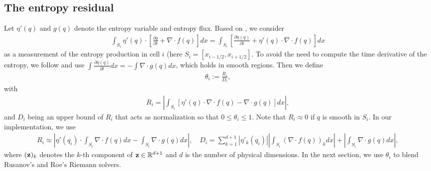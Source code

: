 \documentclass[preprint, 11pt]{article}
\newcommand{\imh}{{i-1/2}}
\newcommand{\iph}{{i+1/2}}
\newcommand{\bff}{{f}}
\newcommand{\entvar}{\eta'}
\newcommand{\bfq}{{q}}
\newcommand{\bfx}{{x}}
\newcommand{\entflux}{g}
\begin{document}
\subsection{The entropy residual}
Let $\entvar(\bfq)$ and $\entflux(\bfq)$ denote the entropy variable and entropy flux.
Based on \cite{guermond2011entropy}, we consider
\begin{align}\label{ent_residual}
  \int_{S_i} \entvar(\bfq) \cdot \left[ \frac{\partial \bfq}{\partial t} + \nabla\cdot \bff(\bfq)\right]d\bfx
  =\int_{S_i} \left[\frac{\partial \eta(\bfq)}{\partial t} + \entvar(\bfq) \cdot \nabla\cdot \bff(\bfq)\right] d\bfx
\end{align}
as a measurement of the entropy production in cell $i$ (here $S_i=[x_\imh,x_\iph]$.
To avoid the need to compute the time derivative of the entropy, we follow
\cite{guermond2018second, guermond2018well} and use
$\int \frac{\partial\eta(\bfq)}{\partial t}d\bfx=-\int \nabla\cdot\entflux(\bfq) d\bfx$,
which holds in smooth regions. Then we define
\begin{align}\label{Ri}
  \theta_i := \frac{R_i}{D_i},
\end{align}
with
\begin{align*}
  R_i=
  \left|\int_{S_i} \left[\entvar(\bfq) \cdot \nabla\cdot \bff(\bfq) - \nabla\cdot\entflux(\bfq) \right] d\bfx\right|,
\end{align*}
and $D_i$ being an upper bound of $R_i$ that acts as normalization so that $0\leq \theta_i\leq 1$.
Note that $R_i\approx 0$ if $\bfq$ is smooth in $S_i$.
In our implementation, we use
\begin{align*}
  R_i\approx \left|\entvar(\bfq_i)\cdot \int_{S_i}\nabla\cdot \bff(\bfq)d\bfx
  -\int_{S_i}\nabla\cdot\entflux(\bfq) d\bfx\right|,
  \quad
  D_i = \sum_{k=1}^{d+1}|\entvar_k(\bfq_i)|\left|\int_{S_i}\left(\nabla\cdot\bff(\bfq)\right)_kd\bfx\right|
  +\left|\int_{S_i}\nabla\cdot\entflux(\bfq)d\bfx\right|,
\end{align*}
where $({\bf z})_k$ denotes the $k$-th component of ${\bf z}\in\mathbb{R}^{d+1}$ and $d$ is the number of physical
dimensions. In the next section, we use $\theta_i$ to blend Rusanov's and Roe's Riemann solvers.
\end{document}
